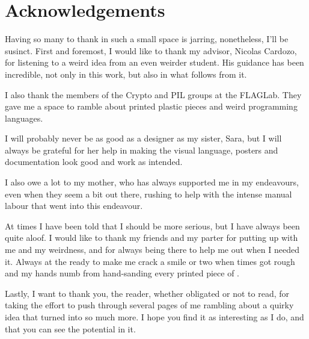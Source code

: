 
\chapter{Acknowledgements}

Having so many to thank in such a small space is jarring, nonetheless, I'll be susinct.
First and foremost, I would like to thank my advisor, Nicolas Cardozo, for listening to a weird idea from an even weirder student.
His guidance has been incredible, not only in this work, but also in what follows from it.

I also thank the members of the Crypto and PIL groups at the FLAGLab. They gave me a space to ramble about printed plastic pieces and
weird programming languages.

I will probably never be as good as a designer as my sister, Sara, but I will always be grateful for
her help in making the \sculpt visual language, posters and documentation look good and work as intended.

I also owe a lot to my mother, who has always supported me in my endeavours, even when they seem a bit out there, rushing to help with the intense manual labour that went into this endeavour.

At times I have been told that I should be more serious, but I have always been quite aloof.
I would like to thank my friends and my parter for putting up with me and my weirdness, and for always being there to help me out when I needed it.
Always at the ready to make me crack a smile or two when times got rough and my hands numb from hand-sanding every printed piece of \sculpt.

Lastly, I want to thank you, the reader, whether obligated or not to read, for taking the effort to push through several pages of me rambling about
a quirky idea that turned into so much more.
I hope you find it as interesting as I do, and that you can see the potential in it.


\endinput

